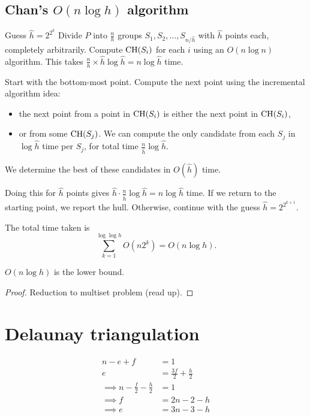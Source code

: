 \section{Chan's $O(n \log h)$ algorithm} \label{sec:hull:chan}

Guess $\hat h = 2^{2^k}$
Divide $P$ into $\frac nh$ groups $S_1, S_2, \dots, S_{n/\hat h}$ with
$\hat h$ points
each, completely arbitrarily.
Compute $\operatorname{CH}(S_i)$ for each $i$ using an $O(n \log n)$ algorithm.
This takes $\frac nh \times \hat h \log \hat h = n \log \hat h$ time.

Start with the bottom-most point.
Compute the next point using the incremental algorithm idea:
\begin{itemize}
    \item the next point from a point in $\operatorname{CH}(S_i)$ is either the next point
        in $\operatorname{CH}(S_i)$,
    \item or from some $\operatorname{CH}(S_j)$.
        We can compute the only candidate from each $S_j$ in $\log \hat h$
        time per $S_j$, for total time $\frac{n}{\hat h} \log \hat h$.
\end{itemize}
We determine the best of these candidates in $O(\hat h)$ time.

Doing this for $\hat h$ points gives
$\hat h \cdot \frac{n}{\hat h} \log \hat h = n \log \hat h$ time.
If we return to the starting point, we report the hull.
Otherwise, continue with the guess $\hat h = 2^{2^{k+1}}$.

The total time taken is \[
    \sum_{k=1}^{\log \log h} O(n 2^k) = O(n \log h).
\]

\begin{theorem} \label{thm:hull:chan:lower-bound}
    $O(n \log h)$ is the lower bound.
\end{theorem}
\begin{proof}
    Reduction to multiset problem (read up).
\end{proof}

\chapter{Delaunay triangulation} \label{chp:delaunay}
\begin{align*}
    n - e + f &= 1 \\
    e &= \frac{3f}{2} + \frac h2 \\
    \implies n - \frac f2 - \frac h2 &= 1 \\
    \implies f &= 2n - 2 - h \\
    \implies e &= 3n - 3 - h
\end{align*}


